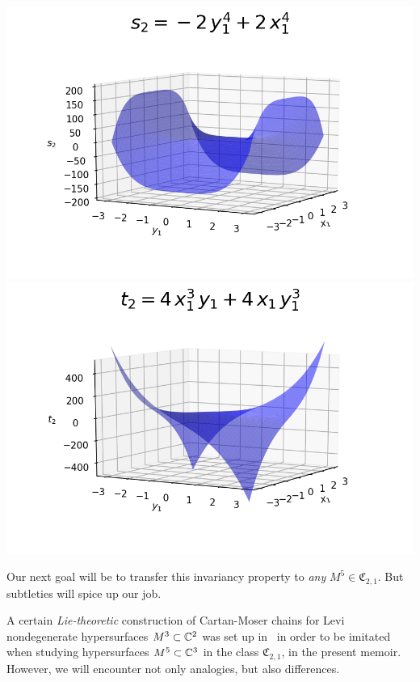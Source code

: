 \documentclass[12pt,twoside,leqno,openany]{amsart}
\begin{document}
\begin{center}
\includegraphics[scale=0.50]{jm5.png}
\!\!\!\!\!\!\!\!\!\!
\includegraphics[scale=0.50]{jm6.png}
\end{center}

Our next goal will be to transfer this invariancy property
to {\em any} $M^5 \in \mathfrak{C}_{2,1}$. But subtleties 
will spice up our job.

\label{road-map-convergent-normal-form}

A certain {\sl Lie-theoretic}
construction of Cartan-Moser chains for
Levi nondegenerate hypersurfaces $M^3 \subset \mathbb{C}^2$ was set up
in~{\cite{Merker-2020}} in order to be imitated 
when studying hypersurfaces
$M^5 \subset \mathbb{C}^3$ in the class $\mathfrak{C}_{2,1}$, 
in the present memoir.
However, we will encounter not only analogies,
but also differences.
\end{document}
